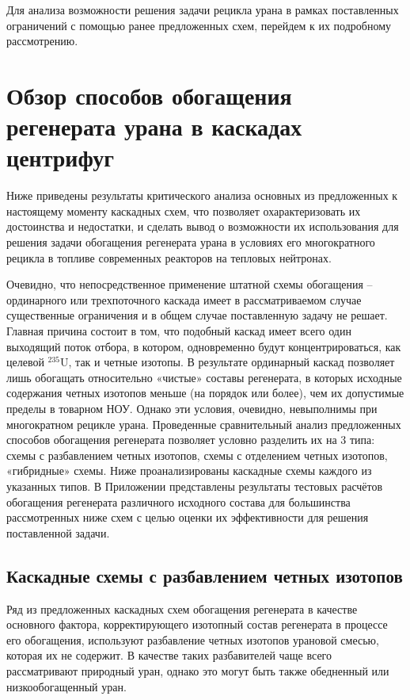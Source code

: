 Для анализа возможности решения задачи рецикла урана в рамках поставленных ограничений с помощью ранее предложенных схем, перейдем к их подробному рассмотрению.

\section{Обзор способов обогащения регенерата урана в каскадах центрифуг}

Ниже приведены результаты критического анализа основных из предложенных к настоящему моменту каскадных схем, что позволяет охарактеризовать их достоинства и недостатки,  и сделать вывод о возможности их использования для решения задачи обогащения регенерата урана в условиях его многократного рецикла в топливе современных реакторов на тепловых нейтронах.

Очевидно, что непосредственное применение штатной схемы обогащения -- ординарного или трехпоточного каскада имеет в рассматриваемом случае существенные ограничения и в общем случае поставленную задачу не решает. Главная причина состоит в том, что подобный каскад имеет всего один выходящий поток отбора, в котором, одновременно будут концентрироваться, как целевой  $^{235}$U, так и четные изотопы. В результате ординарный каскад позволяет лишь обогащать относительно «чистые» составы регенерата, в которых исходные содержания четных изотопов меньше (на порядок или более), чем их допустимые пределы в товарном НОУ. Однако эти условия, очевидно, невыполнимы при многократном рецикле урана.
Проведенные сравнительный анализ предложенных способов обогащения регенерата позволяет условно разделить их на 3 типа: схемы с разбавлением четных изотопов,  схемы с отделением четных изотопов, «гибридные» схемы. 
Ниже проанализированы каскадные схемы каждого из указанных типов. В Приложении представлены результаты тестовых расчётов обогащения регенерата различного исходного состава для большинства рассмотренных ниже схем с целью оценки их эффективности для решения поставленной задачи.

\subsection{Каскадные схемы с разбавлением четных изотопов}

Ряд из предложенных каскадных схем обогащения регенерата в качестве основного фактора, корректирующего изотопный состав регенерата в процессе его обогащения, используют разбавление четных изотопов урановой смесью, которая их не содержит. В качестве таких разбавителей чаще всего рассматривают природный уран, однако это могут быть также обедненный или низкообогащенный уран.

